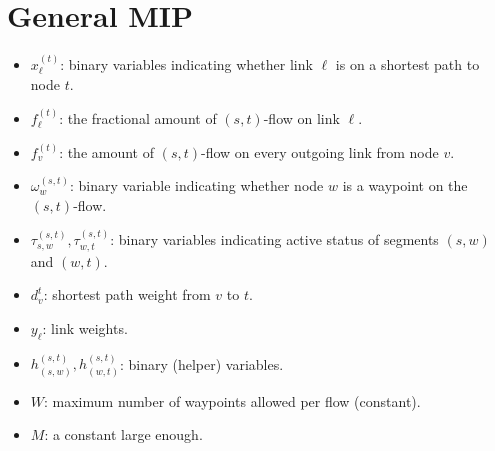 \documentclass[a4paper,USenglish]{lipics-v2018}
\begin{document}
\section{General MIP}
\begin{itemize}
\item	
	$x^{(t)}_{\ell}$:	binary variables indicating whether link $\ell$ is on a shortest path to node $t$.
\item	
	$f^{(t)}_{\ell}$: the fractional amount of $(s,t)$-flow on link $\ell$.
\item	
	$f^{(t)}_{v}$:  the amount of $(s,t)$-flow on every outgoing link from node $v$.
\item
	$\omega^{(s,t)}_{w}$: binary variable indicating whether node $w$ is a waypoint on the $(s,t)$-flow. 
\item $\tau^{(s,t)}_{s,w}, \tau^{(s,t)}_{w,t}$: binary variables indicating active status of segments $(s,w)$ and $(w,t)$.
\item
	$d^{t}_v$: shortest path weight from $v$ to $t$.
\item	
	$y_{\ell}$: link weights.
\item	
	$h^{(s,t)}_{(s,w)}, h^{(s,t)}_{(w,t)}$: binary (helper) variables.
\item
	$W$: maximum  number of waypoints allowed per flow (constant).
\item
	$M$: a constant large enough.	
\end{itemize}
\end{document}
